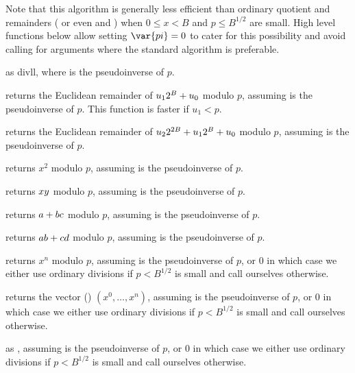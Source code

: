 Note that this algorithm is generally less efficient than ordinary quotient
and remainders ( or even \kbd{/} and \kbd{\%}) when $0\leq x < B$
and $p \leq B^{1/2}$ are small. High level functions below allow setting
$\var{pi} = 0$ to cater for this possibility and avoid calling
 for arguments where the standard algorithm is preferable.

as divll, where  is the pseudoinverse of $p$.

 returns
the Euclidean remainder of $u_1\*2^B+u_0$ modulo $p$, assuming  is the
pseudoinverse of $p$.  This function is faster if $u_1 < p$.

returns the Euclidean remainder of $u_2\*2^{2\*B}+u_1\*2^{B}+u_0$ modulo $p$,
assuming  is the pseudoinverse of $p$.

 returns $x^2$ modulo $p$,
assuming  is the pseudoinverse of $p$.

 returns $x\*y$
modulo $p$, assuming  is the pseudoinverse of $p$.

returns $a+b\*c$ modulo $p$, assuming  is the pseudoinverse of $p$.

returns $a\*b+c\*d$ modulo $p$, assuming  is the pseudoinverse of $p$.

 returns
$x^n$ modulo $p$, assuming  is the pseudoinverse of $p$, or $0$
in which case we either use ordinary divisions if $p < B^{1/2}$ is small
and call  ourselves otherwise.

 returns
the vector () $(x^0, \dots, x^n)$, assuming  is
the pseudoinverse of $p$, or $0$ in which case we either use ordinary
divisions if $p < B^{1/2}$ is small and call  ourselves
otherwise.

as , assuming  is the pseudoinverse of $p$, or $0$ in
which case we either use ordinary divisions if $p < B^{1/2}$ is small and
call  ourselves otherwise.

